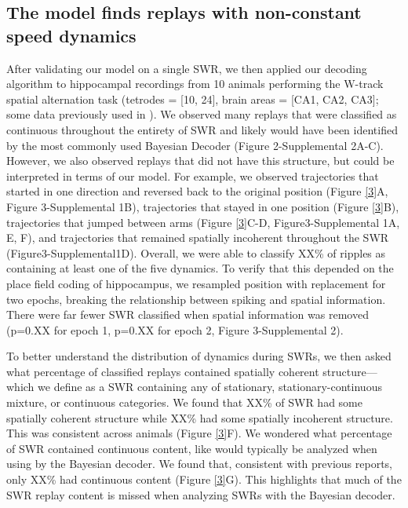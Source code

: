 \documentclass[times, twoside]{zHenriquesLab-StyleBioRxiv}
\begin{document}
\subsection*{The model finds replays with non-constant speed dynamics}
After validating our model on a single SWR, we then applied our decoding algorithm to hippocampal recordings from 10 animals performing the W-track spatial alternation task (tetrodes = [10, 24], brain areas = [CA1, CA2, CA3]; some data previously used in \cite{KarlssonAwakereplayremote2009}). We observed many replays that were classified as continuous throughout the entirety of SWR and likely would have been identified by the most commonly used Bayesian Decoder (Figure 2-Supplemental 2A-C). However, we also observed replays that did not have this structure, but could be interpreted in terms of our model. For example, we observed trajectories that started in one direction and reversed back to the original position (Figure \ref{3}A, Figure 3-Supplemental 1B), trajectories that stayed in one position (Figure \ref{3}B), trajectories that jumped between arms (Figure \ref{3}C-D, Figure3-Supplemental 1A, E, F), and trajectories that remained spatially incoherent throughout the SWR (Figure3-Supplemental1D). Overall, we were able to classify XX\% of ripples as containing at least one of the five dynamics. To verify that this depended on the place field coding of hippocampus, we resampled position with replacement for two epochs, breaking the relationship between spiking and spatial information. There were far fewer SWR classified when spatial information was removed (p=0.XX for epoch 1, p=0.XX for epoch 2, Figure 3-Supplemental 2).

To better understand the distribution of dynamics during SWRs, we then asked what percentage of classified replays contained spatially coherent structure---which we define as a SWR containing any of stationary, stationary-continuous mixture, or continuous categories. We found that XX\% of SWR had some spatially coherent structure while XX\% had some spatially incoherent structure. This was consistent across animals (Figure \ref{3}F). We wondered what percentage of SWR contained continuous content, like would typically be analyzed when using by the Bayesian decoder. We found that, consistent with previous reports, only XX\% had continuous content (Figure \ref{3}G). This highlights that much of the SWR replay content is missed when analyzing SWRs with the Bayesian decoder.
\end{document}
